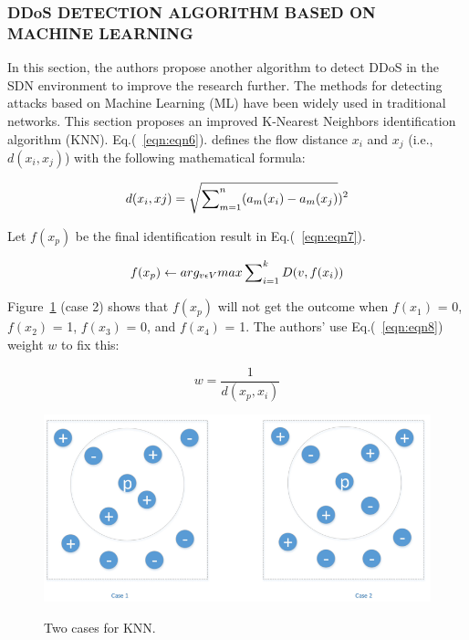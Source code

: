 \documentclass[12pt]{report}
\begin{document}
\subsubsection{DDoS DETECTION ALGORITHM BASED ON MACHINE LEARNING}

In this section, the authors propose another algorithm to detect DDoS in the SDN environment to improve the research further. The methods for detecting attacks based on Machine Learning (ML) have been widely used in traditional networks. This section proposes an improved K-Nearest Neighbors identification algorithm (KNN). Eq.(~\ref{eqn:eqn6}). defines the flow distance $x_{i}$ and $x_{j}$ (i.e., $d(x_{i}, x_{j})$) with the following mathematical formula:

\begin{equation}
    {d(x_{i},x{j})=\sqrt{\sum _{m=1}^{n} \nolimits (a_{m}(x_{i})-a_{m}(x_{j})})^{2}}
    \label{eqn:eqn6}
\end{equation}

Let $f(x_{p})$ be the final identification result in Eq.(~\ref{eqn:eqn7}).

\begin{equation}
    {f(x_{p})\leftarrow arg_{v\epsilon V}max\sum _{i=1}^{k} \nolimits D(v,f(x_{i}))}
    \label{eqn:eqn7}
\end{equation}

Figure~\ref{fig:casesknn} (case 2) shows that $f (x_{p})$ will not get the outcome when $f (x_{1})$ = 0, $f (x_{2})$ = 1, $f (x_{3})$ = 0, and $f (x_{4})$ = 1. The authors' use Eq.(~\ref{eqn:eqn8}) weight $w$ to fix this: 

\begin{equation}
    {w=\frac{1}{d(x_{p},x_{i})}}
    \label{eqn:eqn8}
\end{equation}

\begin{figure}[H]
    \centering
    \includegraphics[scale=0.4]{fig13.png}\\
    \caption{Two cases for KNN.}
    \label{fig:casesknn}
\end{figure}
\end{document}
